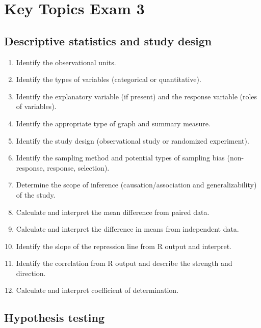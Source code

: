 \documentclass[
]{report}
\begin{document}
\section{Key Topics Exam 3}\label{key-topics-exam-3}

\subsection*{Descriptive statistics and study design}\label{descriptive-statistics-and-study-design-2}

\begin{enumerate}
\def\labelenumi{\arabic{enumi}.}
\item
  Identify the observational units.
\item
  Identify the types of variables (categorical or quantitative).
\item
  Identify the explanatory variable (if present) and the response variable (roles of variables).
\item
  Identify the appropriate type of graph and summary measure.
\item
  Identify the study design (observational study or randomized experiment).
\item
  Identify the sampling method and potential types of sampling bias (non-response, response, selection).
\item
  Determine the scope of inference (causation/association and generalizability) of the study.
\item
  Calculate and interpret the mean difference from paired data.
\item
  Calculate and interpret the difference in means from independent data.
\item
  Identify the slope of the repression line from R output and interpret.
\item
  Identify the correlation from R output and describe the strength and direction.
\item
  Calculate and interpret coefficient of determination.
\end{enumerate}

\subsection*{Hypothesis testing}\label{hypothesis-testing-10}
\end{document}
